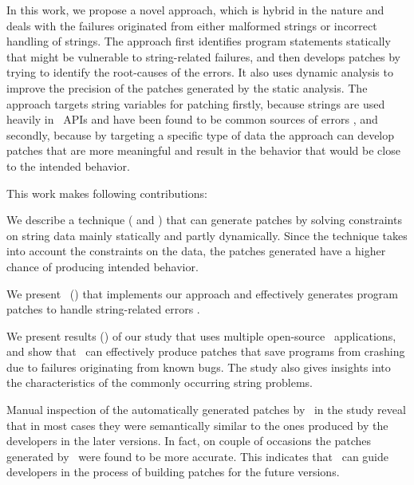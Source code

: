 
In this work, we propose a novel approach, which is hybrid in the nature and
deals with the failures originated from either malformed strings or incorrect
handling of strings. The approach first identifies program statements statically
that might be vulnerable to string-related failures, and then develops patches
by trying to identify the root-causes of the errors. It also uses dynamic
analysis to improve the precision of the patches generated by the static
analysis. The approach targets string variables for patching firstly, because
strings are used heavily in \java\ APIs and have been found to be common sources
of errors \cite{}, and secondly, because by targeting a specific type of data
the approach can develop patches that are more meaningful and result in the
behavior that would be close to the intended behavior.

This work makes following contributions:
\begin{mylist}
\item We describe a technique ( and ) that
can generate patches by solving constraints on string data mainly statically and
partly dynamically. Since the technique takes into account the constraints on
the data, the patches generated have a higher chance of producing intended
behavior.

\item We present \tool\ () that implements our approach
and effectively generates program patches to handle string-related errors
\cite{}.

\item We present results () of our study that uses multiple
open-source \java\ applications, and show that \tool\ can effectively produce
patches that save programs from crashing due to failures originating from known
bugs. The study also gives insights into the characteristics of the commonly
occurring string problems.

\item Manual inspection of the automatically generated patches by \tool\ in the
study reveal that in most cases they were semantically similar to the ones
produced by the developers in the later versions. In fact, on couple of
occasions the patches generated by \tool\ were found to be more accurate. This
indicates that \tool\ can guide developers in the process of building patches
for the future versions.
\end{mylist}

